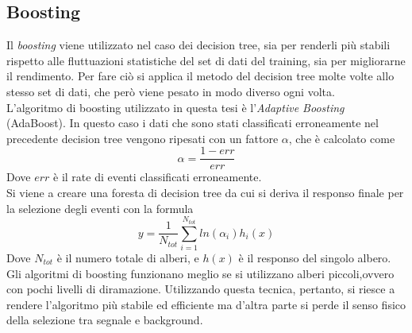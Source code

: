     \subsection{Boosting} \label{Boosting}
    Il \textit{boosting} viene utilizzato nel caso dei decision tree, sia per renderli più stabili rispetto alle fluttuazioni statistiche del set di dati del training, sia per migliorarne il rendimento. Per fare ciò si applica il metodo del decision tree molte volte allo stesso set di dati, che però viene pesato in modo diverso ogni volta. 
    \\L'algoritmo di boosting utilizzato in questa tesi è l'\textit{Adaptive Boosting} (AdaBoost). In questo caso i dati che sono stati classificati erroneamente nel precedente decision tree vengono ripesati con un fattore $\alpha$, che è calcolato come 
        \begin{equation}
            \alpha = \frac{1 - err}{err}
        \end{equation}
    Dove $err$ è il rate di eventi classificati erroneamente. 
    \\Si viene a creare una foresta di decision tree da cui si deriva il responso finale per la selezione degli eventi con la formula 
        \begin{equation}
            y = \frac{1}{N_{tot}} \sum_{i=1}^{N_{tot}} {ln(\alpha_i) h_i(x)}
        \end{equation}
    Dove $N_{tot}$ è il numero totale di alberi, e $h(x)$ è il responso del singolo albero.
    Gli algoritmi di boosting funzionano meglio se si utilizzano alberi piccoli,ovvero con pochi livelli di diramazione.
    Utilizzando questa tecnica, pertanto, si riesce a rendere l'algoritmo più stabile ed efficiente ma d'altra parte si perde il senso fisico della selezione tra segnale e background.%
    
    
    
    

